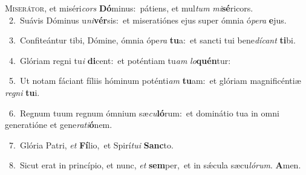 \lettrine{\initial\textcolor{\initialcolor}{M}}{iserátor,} et miséri\textit{cors} \textbf{Dó}\-minus:~\star pátiens, et mul\textit{tum} \textit{mi}\-\textbf{sé}ricors.\\
{\numbfont\textcolor{\numbcolor}{~2.}}~Suávis Dóminus u\-\textit{ni}\-\textbf{vér}sis:~\star et miseratiónes ejus super ómnia ó\-\textit{pe}\-\textit{ra} \textbf{e}\-jus.\par
{\numbfont\textcolor{\numbcolor}{~3.}}~Confiteántur tibi, Dómine, ómnia ópe\textit{ra} \textbf{tu}\-a:~\star et sancti tui bene\-\textit{dí}\-\textit{cant} \textbf{ti}\-bi.\par
{\numbfont\textcolor{\numbcolor}{~4.}}~Glóriam regni tu\textit{i} \textbf{di}\-cent:~\star et poténtiam tu\textit{am} \textit{lo}\-\textbf{quén}tur:\par
{\numbfont\textcolor{\numbcolor}{~5.}}~Ut notam fáciant fíliis hóminum poténti\textit{am} \textbf{tu}\-am:~\star et glóriam magnificéntiæ \textit{re}\-\textit{gni} \textbf{tu}\-i.\par
{\numbfont\textcolor{\numbcolor}{~6.}}~Regnum tuum regnum ómnium sæ\-\textit{cu}\-\textbf{ló}rum:~\star et dominátio tua in omni generatióne et gene\-\textit{ra}\-\textit{ti}\textbf{ó}nem.\par
{\numbfont\textcolor{\numbcolor}{~7.}}~Glória Patri, \textit{et} \textbf{Fí}\-lio,~\star et Spirí\-\textit{tu}\-\textit{i} \textbf{Sanc}\-to.\par
{\numbfont\textcolor{\numbcolor}{~8.}}~Sicut erat in princípio, et nunc, \textit{et} \textbf{sem}\-per,~\star et in sǽcula sæcu\-\textit{ló}\-\textit{rum}. \textbf{A}\-men.\par
